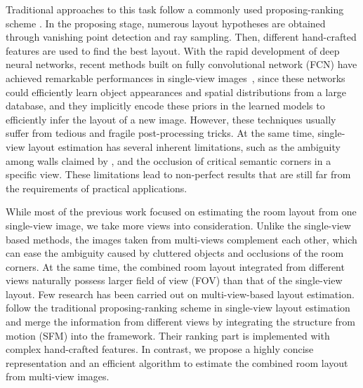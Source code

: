 Traditional approaches to this task follow a commonly used proposing-ranking scheme \cite{hedau2009recovering,wang2013discriminative,gupta2010estimating,hedau2010thinking}. In the proposing stage, numerous layout hypotheses are obtained through vanishing point detection and ray sampling. Then, different hand-crafted features are used to find the best layout. 
With the rapid development of deep neural networks, recent methods built on fully convolutional network (FCN) have achieved remarkable performances in single-view images~\cite{mallya2015learning,dasgupta2016delay,ren2016coarse,zhao2017physics,LeeRoomNet17}, since these networks could efficiently learn object appearances and spatial distributions from a large database, and they implicitly encode these priors in the learned models to efficiently infer the layout of a new image. 
%
However, these techniques usually suffer from tedious and fragile post-processing tricks. At the same time, single-view layout estimation has several inherent limitations, such as the ambiguity among walls claimed by \cite{dasgupta2016delay}, and the occlusion of critical semantic corners in a specific view. These limitations lead to non-perfect results that are still far from the requirements of practical applications.

%
While most of the previous work focused on estimating the room layout from one single-view image, we take more views into consideration. Unlike the single-view based methods, the images taken from multi-views complement each other, which can ease the ambiguity caused by cluttered objects and occlusions of the room corners. At the same time, the combined room layout integrated from different views naturally possess larger field of view (FOV) than that of the single-view layout. 
%
%
Few research has been carried out on multi-view-based layout estimation. \cite{bao2014understanding} follow the traditional proposing-ranking scheme in single-view layout estimation and merge the information from different views by integrating the structure from motion (SFM) into the framework. Their ranking part is implemented with complex hand-crafted features. 
%
In contrast, we propose a highly concise representation and an efficient algorithm to estimate the combined room layout from multi-view images.

